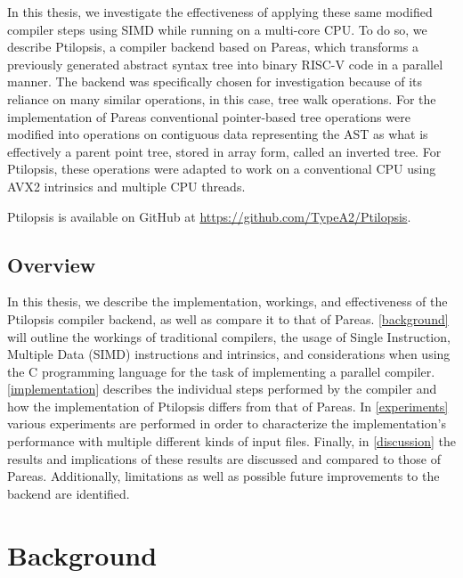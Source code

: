 \documentclass[11pt,dvipsnames]{article}
\newcommand{\Rplus}{\protect\hspace{-.1em}\protect\raisebox{.35ex}{\smaller{\smaller\textbf{+}}}}
\newcommand{\Cpp}{\mbox{C\Rplus\Rplus}\xspace}
\begin{document}
In this thesis, we investigate the effectiveness of applying these same modified compiler steps using SIMD while running on a multi-core CPU. To do so, we describe Ptilopsis, a compiler backend based on Pareas, which transforms a previously generated abstract syntax tree into binary RISC-V code in a parallel manner. The backend was specifically chosen for investigation because of its reliance on many similar operations, in this case, tree walk operations. For the implementation of Pareas conventional pointer-based tree operations were modified into operations on contiguous data representing the AST as what is effectively a parent point tree, stored in array form, called an inverted tree. For Ptilopsis, these operations were adapted to work on a conventional CPU using AVX2 intrinsics \cite{intrinsics} and multiple CPU threads.

Ptilopsis is available on GitHub at \url{https://github.com/TypeA2/Ptilopsis}.

\subsection{Overview}
In this thesis, we describe the implementation, workings, and effectiveness of the Ptilopsis compiler backend, as well as compare it to that of Pareas.
\autoref{background} will outline the workings of traditional compilers, the usage of Single Instruction, Multiple Data (SIMD) instructions and intrinsics, and considerations when using the \Cpp programming language for the task of implementing a parallel compiler.
\autoref{implementation} describes the individual steps performed by the compiler and how the implementation of Ptilopsis differs from that of Pareas.
In \autoref{experiments} various experiments are performed in order to characterize the implementation's performance with multiple different kinds of input files.
Finally, in \autoref{discussion} the results and implications of these results are discussed and compared to those of Pareas. Additionally, limitations as well as possible future improvements to the backend are identified.

\section{Background} \label{background}
\end{document}

